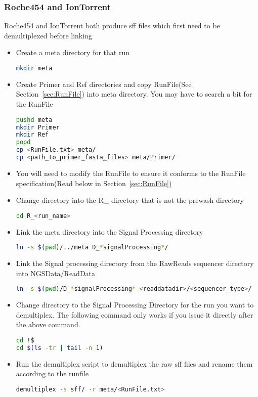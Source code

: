 \documentclass{article}
\begin{document}
\subsubsection{Roche454 and IonTorrent}
Roche454 and IonTorrent both produce sff files which first need to be demultiplexed before linking
\begin{itemize}
\item Create a meta directory for that run
{\tiny
\begin{lstlisting}[language=bash]
mkdir meta
\end{lstlisting}
}
 
\item Create Primer and Ref directories and copy RunFile(See Section~\ref{sec:RunFile}) into meta directory. You may have to search a bit for the RunFile
{\tiny
\begin{lstlisting}[language=bash]
pushd meta
mkdir Primer
mkdir Ref
popd
cp <RunFile.txt> meta/
cp <path_to_primer_fasta_files> meta/Primer/
\end{lstlisting}
}

\item You will need to modify the RunFile to ensure it conforms to the RunFile specification(Read below in Section~\ref{sec:RunFile})

\item Change directory into the R\_ directory that is not the prewash directory
{\tiny
\begin{lstlisting}[language=bash]
cd R_<run_name>
\end{lstlisting}
}

\item Link the meta directory into the Signal Processing directory
{\tiny
\begin{lstlisting}[language=bash]
ln -s $(pwd)/../meta D_*signalProcessing*/
\end{lstlisting}
}

\item Link the Signal processing directory from the RawReads sequencer directory into NGSData/ReadData
{\tiny
\begin{lstlisting}[language=bash]
ln -s $(pwd)/D_*signalProcessing* <readdatadir>/<sequencer_type>/
\end{lstlisting}
}

\item Change directory to the Signal Processing Directory for the run you want to demultiplex. The following command only works if you issue it directly after the above command.
{\tiny
\begin{lstlisting}[language=bash]
cd !$
cd $(ls -tr | tail -n 1)
\end{lstlisting}
}

\item Run the demultiplex script to demultiplex the raw sff files and rename them according to the runfile
{\tiny
\begin{lstlisting}[language=bash]
demultiplex -s sff/ -r meta/<RunFile.txt>
\end{lstlisting}
}
\end{itemize}
\end{document}
